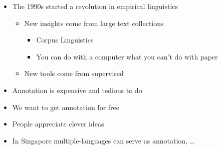\documentclass[a4paper,landscape,headrule,footrule,xetex]{foils}
\begin{document}
\MyLogo{}
\begin{itemize}
\item The 1990s started a revolution in empirical linguistics
  \begin{itemize}
  \item New insights come from  large text collections
    \begin{itemize}
    \item Corpus Linguistics
    \item You can do with a computer what you can't do with paper
    \end{itemize}
  \item New tools come from supervised 
  \end{itemize}
\item Annotation is expensive and tedious to do
\item We want to get annotation for free
\item People appreciate clever ideas
\item In Singapore multiple-languages can serve as annotation, \ldots
\end{itemize}

   




\end{document}
